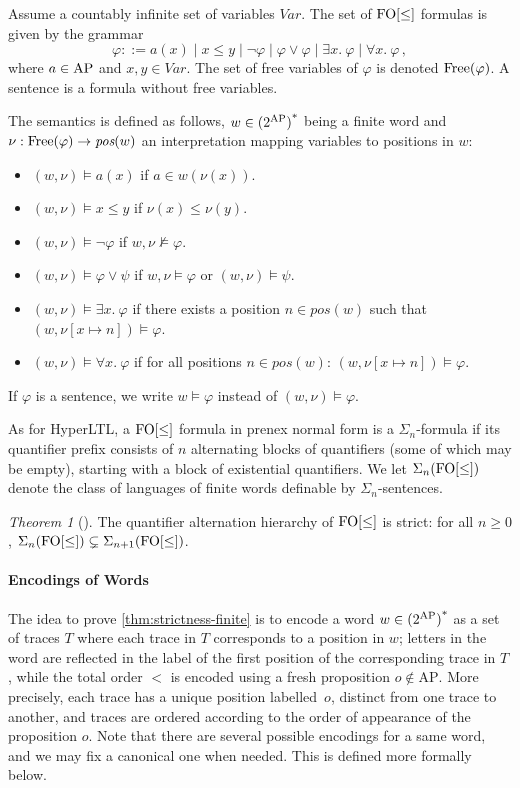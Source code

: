 \documentclass[dvipsnames,10pt,a4paper]{amsart}
\theoremstyle{definition}
\theoremstyle{remark}
\newtheorem{thmC}[thm]{Theorem}
\newcommand{\hyltl}{{HyperLTL}\xspace}
\newcommand\FO{\textup{FO}}
\newcommand{\ap}[0]{\mathrm{AP}}
\newcommand\AP{\textup{AP}}
\newcommand\Free{\textup{Free}}
\newcommand\FOw{\FO[\le]}
\newcommand\varfo{\textit{Var}}
\newcommand\pos{\textit{pos}}
\newcommand\Sfo[1]{\Sigma_{#1}(\FOw)}
\begin{document}
Assume a countably infinite set of variables $\varfo$.
The set of $\FOw$ formulas is given by the grammar
\[
  \varphi ::= a(x) \mid x \le y \mid\lnot \varphi
  \mid \varphi \lor \varphi \mid  \exists x.\ \varphi \mid \forall x.\ \varphi \, ,
\]
where $a \in \AP$ and $x,y \in \varfo$.
The set of free variables of $\varphi$ is denoted $\Free(\varphi)$.
A sentence is a formula without free variables.

The semantics is defined as follows, $w \in {(2^\AP)}^\ast$ being a finite word
and $\nu : \Free(\varphi) \to \pos(w)$ an interpretation mapping variables to
positions in $w$:
\begin{itemize}
\item $(w, \nu) \models a(x)$ if $a \in w(\nu(x))$.
\item $(w, \nu) \models x \le y$ if $\nu(x) \le \nu(y)$.
\item $(w, \nu) \models \lnot \varphi$ if $w, \nu \not\models \varphi$.
\item $(w, \nu) \models \varphi \lor \psi$ if $w, \nu \models \varphi$ or
  $(w, \nu) \models \psi$.
\item $(w, \nu) \models \exists x.\ \varphi$ if there exists a position
  $n \in \pos(w)$ such that $(w,\nu[x \mapsto n]) \models \varphi$.
  \item $(w, \nu) \models \forall x.\ \varphi$ if for all positions
  $n \in \pos(w)$: $(w,\nu[x \mapsto n]) \models \varphi$.
\end{itemize}
If $\varphi$ is a sentence, we write
$w \models \varphi$ instead of $(w,\nu) \models \varphi$.

As for \hyltl, a $\FOw$ formula in prenex normal form is a $\Sigma_n$-formula if its quantifier
prefix consists of $n$ alternating blocks of
quantifiers (some of which may be empty), starting with a block of
existential quantifiers.
We let $\Sfo n$ denote the class of languages of finite words definable
by $\Sigma_n$-sentences.


\begin{thmC}[\cite{Thomas82,CohenB71}]\label{thm:strictness-FO}
  The quantifier alternation hierarchy of $\FOw$ is strict: for all
  $n \ge 0$, $\Sfo {n} \subsetneq \Sfo {n+1}$.
\end{thmC}


\paragraph{Encodings of Words}
The idea to prove \autoref{thm:strictness-finite} is to encode a word $w \in {(2^\AP)}^\ast$ as a set of traces
$T$ where each trace in $T$ corresponds to a position in $w$;
letters in the word are reflected in the label of the first
position of the corresponding trace in $T$, while the total order $<$ is
encoded using a fresh proposition $o \notin \ap$. More precisely, each trace
has a unique position labelled~$o$, distinct from one trace to another,
and traces are ordered according to the order of appearance of
the proposition $o$.
Note that there are several possible encodings for a same word, and we may fix
a canonical one when needed.
This is defined more formally below.
\end{document}
